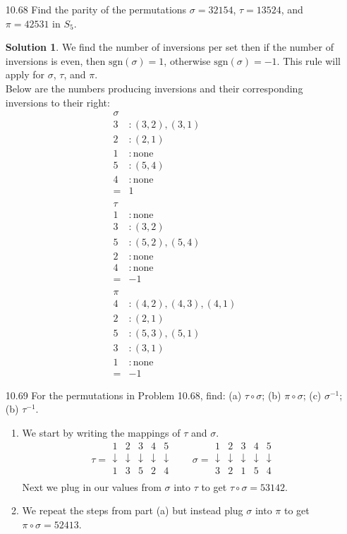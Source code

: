 \documentclass[12pt]{article}
\theoremstyle{definition}
\newtheorem*{solution}{Solution} %
\theoremstyle{plain}
\begin{document}
\begin{enumerate}
\item[10.68]Find the parity of the permutations $\sigma = 32154$, $\tau = 13524$, and $\pi = 42531$ in $S_5$.\\
	\begin{solution}
	We find the number of inversions per set then if the number of inversions is even, then $\mathrm{sgn}(\sigma) = 1$, otherwise $\mathrm{sgn}(\sigma)=-1$. This rule will apply for $\sigma$, $\tau$, and $\pi$.\\
	Below are the numbers producing inversions and their corresponding inversions to their right:
	\begin{align*}
	\sigma&\\
	3&: (3,2),(3,1)\\
	2&: (2,1)\\
	1&: \mathrm{none}\\
	5&: (5,4)\\
	4&: \mathrm{none}\\
	=& 1\\
	{}\\
	\tau&\\
	1&: \mathrm{none}\\
	3&: (3,2)\\
	5&: (5,2),(5,4)\\
	2&: \mathrm{none}\\
	4&: \mathrm{none}\\
	=& -1\\
	{}\\
	\pi&\\
	4&: (4,2),(4,3),(4,1)\\
	2&: (2,1)\\
	5&: (5,3),(5,1)\\
	3&: (3,1)\\
	1&: \mathrm{none}\\
	=& -1
	\end{align*}
	\end{solution}
\item[10.69]For the permutations in Problem 10.68, find: (a) $\tau\circ\sigma$; (b) $\pi\circ\sigma$; (c) $\sigma^{-1}$; (b) $\tau^{-1}$.
	\begin{enumerate}
	\item We start by writing the mappings of $\tau$ and $\sigma$.
	\[ \tau = \begin{matrix}1&2&3&4&5\\\downarrow&\downarrow&\downarrow&\downarrow&\downarrow\\1&3&5&2&4\\\end{matrix} \qquad \sigma = \begin{matrix}1&2&3&4&5\\\downarrow&\downarrow&\downarrow&\downarrow&\downarrow\\3&2&1&5&4\\\end{matrix} \]
	Next we plug in our values from $\sigma$ into $\tau$ to get $\tau \circ \sigma = 53142$.
	\item We repeat the steps from part (a) but instead plug $\sigma$ into $\pi$ to get $\pi \circ \sigma = 52413$.
	\end{enumerate}		
	

\end{enumerate}
\end{document}
